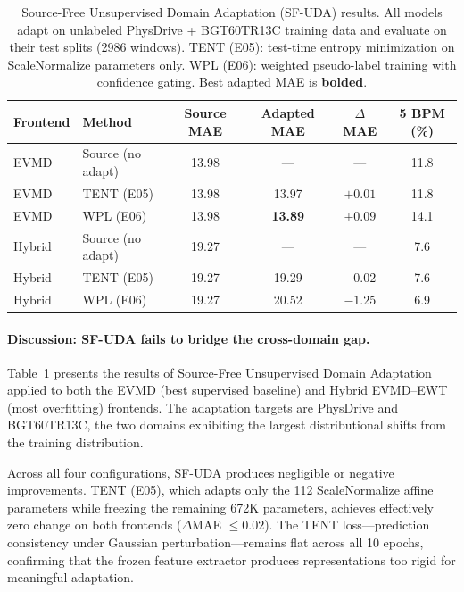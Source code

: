 
\begin{table}[htbp]
\centering
\caption{Source-Free Unsupervised Domain Adaptation (SF-UDA) results. All models adapt on unlabeled PhysDrive + BGT60TR13C training data and evaluate on their test splits (2986 windows). TENT (E05): test-time entropy minimization on ScaleNormalize parameters only. WPL (E06): weighted pseudo-label training with confidence gating. Best adapted MAE is \textbf{bolded}.}
\label{tab:sfuda_results}
\begin{tabular}{llcccc}
\toprule
\textbf{Frontend} & \textbf{Method} & \textbf{Source MAE} & \textbf{Adapted MAE} & \textbf{$\Delta$ MAE} & \textbf{5 BPM (\%)} \\
\midrule
EVMD       & Source (no adapt) & 13.98 & ---    & ---    & 11.8 \\
EVMD       & TENT (E05)        & 13.98 & 13.97  & $+0.01$ & 11.8 \\
EVMD       & WPL  (E06)        & 13.98 & \textbf{13.89} & $\mathbf{+0.09}$ & 14.1 \\
\midrule
Hybrid     & Source (no adapt) & 19.27 & ---    & ---    & 7.6 \\
Hybrid     & TENT (E05)        & 19.27 & 19.29  & $-0.02$ & 7.6 \\
Hybrid     & WPL  (E06)        & 19.27 & 20.52  & $-1.25$ & 6.9 \\
\bottomrule
\end{tabular}
\end{table}

\paragraph{Discussion: SF-UDA fails to bridge the cross-domain gap.}
Table~\ref{tab:sfuda_results} presents the results of Source-Free Unsupervised Domain Adaptation applied to both the EVMD (best supervised baseline) and Hybrid EVMD--EWT (most overfitting) frontends. The adaptation targets are PhysDrive and BGT60TR13C, the two domains exhibiting the largest distributional shifts from the training distribution.

Across all four configurations, SF-UDA produces negligible or negative improvements. TENT (E05), which adapts only the 112 ScaleNormalize affine parameters while freezing the remaining 672K parameters, achieves effectively zero change on both frontends ($\Delta$MAE $\leq 0.02$). The TENT loss---prediction consistency under Gaussian perturbation---remains flat across all 10 epochs, confirming that the frozen feature extractor produces representations too rigid for meaningful adaptation.

